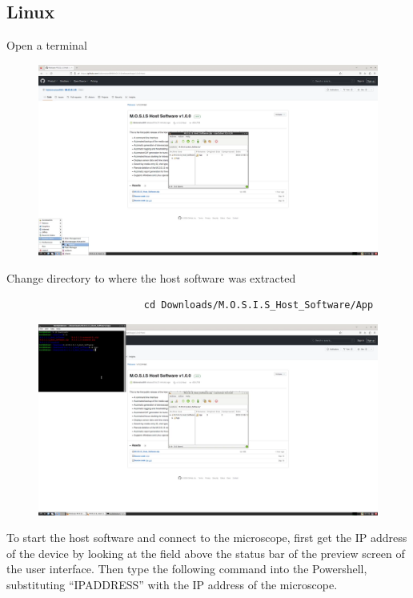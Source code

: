 \documentclass[12pt]{article}
\begin{document}
\begin{center}
	\subsection{Linux}
	\item Open a terminal
	\begin{figure}[H]
		\includegraphics[width=\textwidth]{Figures/Linux-Open-terminal.png}
	\end{figure}
	\item Change directory to where the host software was extracted
	\begin{verbatim}
                        cd Downloads/M.O.S.I.S_Host_Software/App
                      \end{verbatim}
	\begin{figure}[H]
		\includegraphics[width=\textwidth]{Figures/Linux-cd-Host-Software.png}
	\end{figure}
	\item To start the host software and connect to the microscope, first get the IP address of the device by looking at the field above the status bar of the preview screen of the user interface. Then type the following command into the Powershell, substituting ``IPADDRESS'' with the IP address of the microscope.


\end{center}
\end{document}
